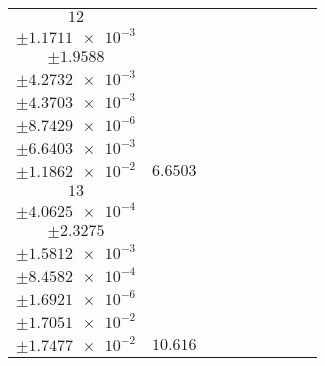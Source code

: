 \documentclass[8pt]{article}
\begin{document}
\begin{longtable}[l]{c c c c c c c c c}
$\num{12}$ & \begin{tabular}[c]{@{}c@{}}$\num{2.6727e-2}$ \\ $\pm\num{1.1711e-3}$\end{tabular} & \begin{tabular}[c]{@{}c@{}}$\num{-0.72853}$ \\ $\pm\num{1.9588}$\end{tabular} & \begin{tabular}[c]{@{}c@{}}$\num{3.0375}$ \\ $\pm\num{4.2732e-3}$\end{tabular} & \begin{tabular}[c]{@{}c@{}}$\num{3.586e+3}$ \\ $\pm\num{4.3703e-3}$\end{tabular} & \begin{tabular}[c]{@{}c@{}}$\num{7.174}$ \\ $\pm\num{8.7429e-6}$\end{tabular} & \begin{tabular}[c]{@{}c@{}}$\num{0.57386}$ \\ $\pm\num{6.6403e-3}$\end{tabular} & \begin{tabular}[c]{@{}c@{}}$\num{0.54102}$ \\ $\pm\num{1.1862e-2}$\end{tabular} & $\num{6.6503}$\\
$\num{13}$ & \begin{tabular}[c]{@{}c@{}}$\num{3.5404e-2}$ \\ $\pm\num{4.0625e-4}$\end{tabular} & \begin{tabular}[c]{@{}c@{}}$\num{-1.6005}$ \\ $\pm\num{2.3275}$\end{tabular} & \begin{tabular}[c]{@{}c@{}}$\num{3.272}$ \\ $\pm\num{1.5812e-3}$\end{tabular} & \begin{tabular}[c]{@{}c@{}}$\num{3.5862e+3}$ \\ $\pm\num{8.4582e-4}$\end{tabular} & \begin{tabular}[c]{@{}c@{}}$\num{7.1744}$ \\ $\pm\num{1.6921e-6}$\end{tabular} & \begin{tabular}[c]{@{}c@{}}$\num{0.57411}$ \\ $\pm\num{1.7051e-2}$\end{tabular} & \begin{tabular}[c]{@{}c@{}}$\num{0.55331}$ \\ $\pm\num{1.7477e-2}$\end{tabular} & $\num{10.616}$\\

\end{longtable}
\end{document}
